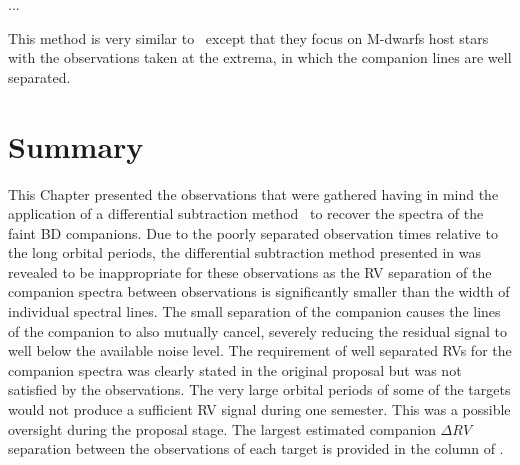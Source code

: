 ...

This method is very similar to~\citet{kostogryz_spectral_2013} except that they focus on M-dwarfs host stars with the observations taken at the extrema, in which the companion lines are well separated. 

\section{Summary}
This Chapter  presented the observations that were gathered having in mind the application of a differential subtraction method~\citep[e.g.][]{ferluga_separating_1997, kostogryz_spectral_2013} to recover the spectra of the faint {BD} companions.  Due to the poorly separated observation times relative to the long orbital periods, the differential subtraction method presented in  was revealed to be inappropriate for these observations as the {RV} separation of the companion spectra between observations is significantly smaller than the width of individual spectral lines. The small separation of the companion causes the lines of the companion to also mutually cancel, severely reducing the residual signal to well below the available noise level. The requirement of well separated RVs for the companion spectra was clearly stated in the original proposal but was not satisfied by the observations. {\red{} The very large orbital periods of some of the targets would not produce a sufficient {RV} signal during one semester. This was a possible oversight during the proposal stage.} The largest estimated companion \(\Delta {RV}\) separation between the observations of each target is provided in the   column of . 
